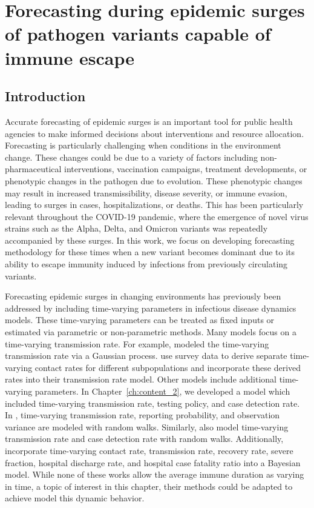 \chapter{Forecasting during epidemic surges of pathogen variants capable of immune escape}
\graphicspath{{figures/ch_5/}}
\label{ch:content_3}

\section{Introduction}
\label{ch_5:sec:intro}

Accurate forecasting of epidemic surges is an important tool for public health agencies to make informed decisions about interventions and resource allocation.
Forecasting is particularly challenging when conditions in the environment change.
These changes could be due to a variety of factors including non-pharmaceutical interventions, vaccination campaigns, treatment developments, or phenotypic changes in the pathogen due to evolution.
These phenotypic changes may result in increased transmissibility, disease severity, or immune evasion, leading to surges in cases, hospitalizations, or deaths.
This has been particularly relevant throughout the COVID-19 pandemic, where the emergence of novel virus strains such as the Alpha, Delta, and Omicron variants was repeatedly accompanied by these surges.
In this work, we focus on developing forecasting methodology for these times when a new variant becomes dominant due to its ability to escape immunity induced by infections from previously circulating variants.

Forecasting epidemic surges in changing environments has previously been addressed by including time-varying parameters in infectious disease dynamics models.
These time-varying parameters can be treated as fixed inputs or estimated via parametric or non-parametric methods.
Many models focus on a time-varying transmission rate.
For example, \citet{Zhou2020Semiparametric} modeled the time-varying transmission rate via a Gaussian process.
\citet{Iyaniwura2022Mathematical} use survey data to derive separate time-varying contact rates for different subpopulations and incorporate these derived rates into their transmission rate model.
Other models include additional time-varying parameters.
In Chapter~\ref{ch:content_2}, we developed a model which included time-varying transmission rate, testing policy, and case detection rate.
In \citep{ODea2021semi}, time-varying transmission rate, reporting probability, and observation variance are modeled with random walks.
Similarly, \citet{Gibson2020real} also model time-varying transmission rate and case detection rate with random walks.
Additionally, \citet{morozova2021one} incorporate time-varying contact rate, transmission rate, recovery rate, severe fraction, hospital discharge rate, and hospital case fatality ratio into a Bayesian model.
While none of these works allow the average immune duration as varying in time, a topic of interest in this chapter, their methods could be adapted to achieve model this dynamic behavior.

